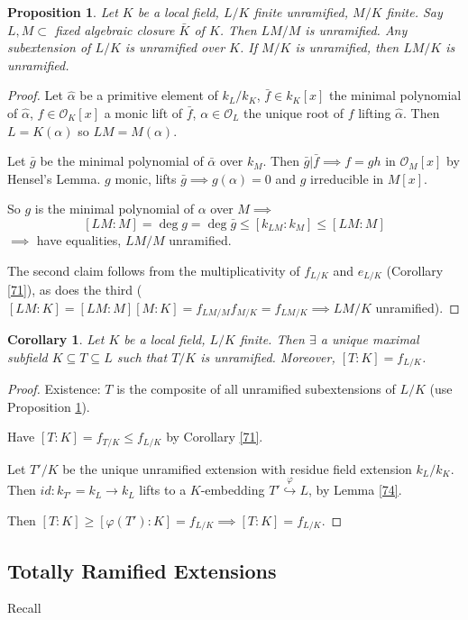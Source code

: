\documentclass[a4paper]{article}
\newtheorem{prop}[definition]{Proposition}
\newtheorem{corollary}[definition]{Corollary}
\begin{document}
\begin{prop}
	Let $K$ be a local field, $L/K$ finite unramified, $M/K$ finite.
	Say $L,M \subset$ fixed algebraic closure $\bar{K}$ of $K$.
	Then $LM/M$ is unramified.
	Any subextension of $L/K$ is unramified over $K$.
	If $M/K$ is unramified, then $LM/K$ is unramified.
	\label{75}
\end{prop}
\begin{proof}
	Let $\hat{\alpha}$ be a primitive element of $k_L/k_K$,
	$\bar{f} \in k_K[x]$ the minimal polynomial of $\hat{\alpha}$,
	$f \in \mathcal{O}_K[x]$ a monic lift of $\bar{f}$,
	$\alpha \in \mathcal{O}_L$ the unique root of $f$ lifting $\hat{\alpha}$.
	Then $L=K(\alpha)$ so $LM=M(\alpha)$.
	
	Let $\bar{g}$ be the minimal polynomial of $\bar{\alpha}$ over $k_M$.
	Then $\bar{g} | \bar{f} \implies f=gh$ in $\mathcal{O}_M[x]$ by Hensel's Lemma.
	$g$ monic, lifts $\bar{g} \implies g(\alpha)=0$ and $g$ irreducible in $M[x]$.
	
	So $g$ is the minimal polynomial of $\alpha$ over $M \implies$
	$$[LM:M] = \deg g = \deg \bar{g} \leq [k_{LM} : k_M] \leq [LM:M]$$
	$\implies$ have equalities, $LM/M$ unramified.
	
	The second claim follows from the multiplicativity of $f_{L/K}$ and $e_{L/K}$ (Corollary \ref{71}),
	as does the third
	($[LM:K] = [LM:M][M:K] = f_{LM/M}f_{M/K} = f_{LM/K} \implies LM/K$ unramified).
\end{proof}


\begin{corollary}
	Let $K$ be a local field, $L/K$ finite.
	Then $\exists$ a unique maximal subfield $K \subseteq T \subseteq L$ such that $T/K$ is unramified. 
	Moreover, $[T:K] = f_{L/K}$.
\end{corollary}
\begin{proof}
	Existence: $T$ is the composite of all unramified subextensions of $L/K$ (use Proposition \ref{75}).
	
	Have $[T:K] = f_{T/K} \leq f_{L/K}$ by Corollary \ref{71}.
	
	Let $T'/K$ be the unique unramified extension with residue field extension $k_L/k_K$.
	Then $id: k_{T'} = k_L \to k_L$ lifts to a $K$-embedding $T' \overset{\varphi}{\hookrightarrow} L$, by Lemma \ref{74}.
	
	Then $[T:K] \geq [\varphi(T'):K] = f_{L/K} \implies [T:K]=f_{L/K}$.
\end{proof}

\subsection{Totally Ramified Extensions}
Recall
\end{document}
